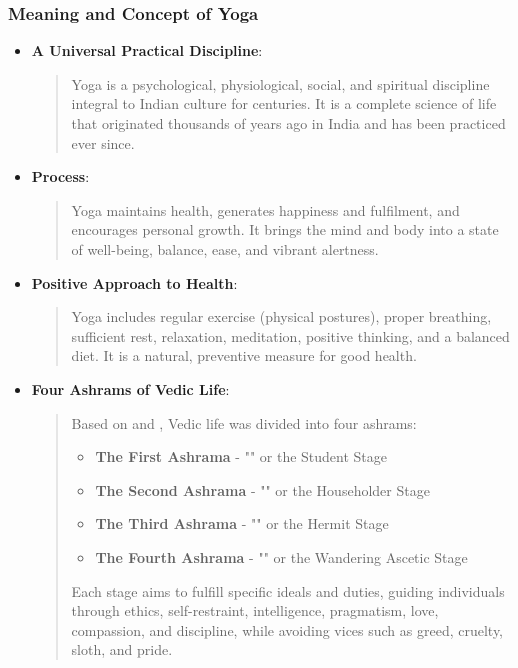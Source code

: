 \begin{frame}[fragile]\frametitle{Meaning and Concept of Yoga}
      \begin{itemize}
        \item \textbf{A Universal Practical Discipline}: 
          \begin{quote}
          Yoga is a psychological, physiological, social, and spiritual discipline integral to Indian culture for centuries. It is a complete science of life that originated thousands of years ago in India and has been practiced ever since.
          \end{quote}
        \item \textbf{Process}: 
          \begin{quote}
          Yoga maintains health, generates happiness and fulfilment, and encourages personal growth. It brings the mind and body into a state of well-being, balance, ease, and vibrant alertness.
          \end{quote}
        \item \textbf{Positive Approach to Health}: 
          \begin{quote}
          Yoga includes regular exercise (physical postures), proper breathing, sufficient rest, relaxation, meditation, positive thinking, and a balanced diet. It is a natural, preventive measure for good health.
          \end{quote}
        \item \textbf{Four Ashrams of Vedic Life}: 
          \begin{quote}
          Based on  and , Vedic life was divided into four ashrams: 
          \begin{itemize}
            \item \textbf{The First Ashrama} - "" or the Student Stage
            \item \textbf{The Second Ashrama} - "" or the Householder Stage
            \item \textbf{The Third Ashrama} - "" or the Hermit Stage
            \item \textbf{The Fourth Ashrama} - "" or the Wandering Ascetic Stage
          \end{itemize}
          Each stage aims to fulfill specific ideals and duties, guiding individuals through ethics, self-restraint, intelligence, pragmatism, love, compassion, and discipline, while avoiding vices such as greed, cruelty, sloth, and pride.
          \end{quote}
      \end{itemize}
\end{frame}

